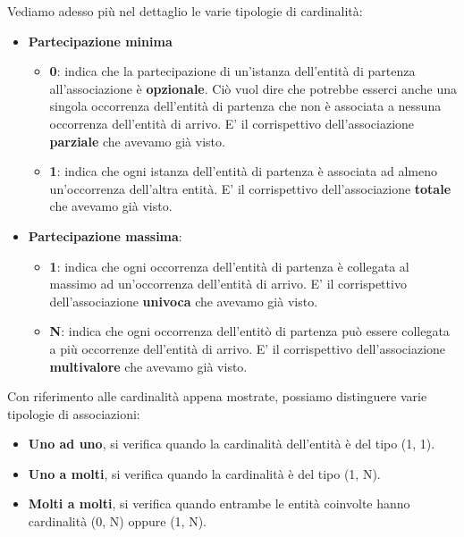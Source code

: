 \documentclass[12pt]{report}
\begin{document}
	Vediamo adesso più nel dettaglio le varie tipologie di cardinalità:
	\begin{itemize}
		\item \textbf{Partecipazione minima}
		\begin{itemize}
			\item \textbf{0}: indica che la partecipazione di un'istanza dell'entità di partenza all'associazione è \textbf{opzionale}. Ciò vuol dire che potrebbe esserci anche una singola occorrenza dell'entità di partenza che non è associata a nessuna occorrenza dell'entità di arrivo. E' il corrispettivo dell'associazione \textbf{parziale} che avevamo già visto.
			
			\item \textbf{1}: indica che ogni istanza dell'entità di partenza è associata ad almeno un'occorrenza dell'altra entità. E' il corrispettivo dell'associazione \textbf{totale} che avevamo già visto.
		\end{itemize}
		
		\item \textbf{Partecipazione massima}:
		\begin{itemize}
			\item \textbf{1}: indica che ogni occorrenza dell'entità di partenza è collegata al massimo ad un'occorrenza dell'entità di arrivo. E' il corrispettivo dell'associazione \textbf{univoca} che avevamo già visto.
			
			\item \textbf{N}: indica che ogni occorrenza dell'entitò di partenza può essere collegata a più occorrenze dell'entità di arrivo. E' il corrispettivo dell'associazione \textbf{multivalore} che avevamo già visto.
		\end{itemize}
	\end{itemize}
	
	Con riferimento alle cardinalità appena mostrate, possiamo distinguere varie tipologie di associazioni:
	\begin{itemize}
		\item \textbf{Uno ad uno}, si verifica quando la cardinalità dell'entità è del tipo (1, 1).
		
		\item \textbf{Uno a molti}, si verifica quando la cardinalità è del tipo (1, N).
		
		\item \textbf{Molti a molti}, si verifica quando entrambe le entità coinvolte hanno cardinalità (0, N) oppure (1, N).
	\end{itemize}
	
\end{document}
